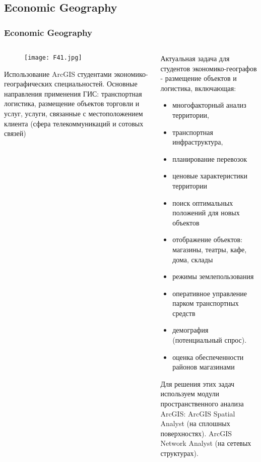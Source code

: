 \documentclass[pdflatex,compress,8pt,
	xcolor={dvipsnames,dvipsnames,svgnames,x11names,table},
	hyperref={	 
	pdfauthor={Lemenkova Polina}, 
	pdfsubject={Preentation}, 
	pdfcreator={Lemenkova Polina}, 
	pdfproducer={Lemenkova Polina}, 
	colorlinks=true,
	linkcolor=Red3, 
	citecolor=NavyBlue, 
	urlcolor = NavyBlue, 
	breaklinks = true}]{beamer}
\begin{document}
\subsection{Economic Geography}
\begin{frame}\frametitle{Economic Geography}

	\begin{minipage}[0.4\textheight]{\textwidth}
		\begin{columns}[T]
			\begin{column}{0.5\textwidth}
				\begin{figure}[H]
					\centering
					\texttt{[image: F41.jpg]}
				\end{figure}
\small{	
\begin{alertblock}{}
Использование ArcGIS студентами экономико-географических специальностей. Основные направления применения ГИС: транспортная логистика, размещение объектов торговли и услуг, услуги, связанные с местоположением клиента (сфера телекоммуникаций и сотовых связей)
\end{alertblock}
}
			\end{column}
			\begin{column}{0.5\textwidth}
\small{
\begin{block}{}
Актуальная задача для студентов экономико-географов - размещение объектов и логистика, 
включающая:
\begin{itemize}
	\item многофакторный анализ территории, 
	\item транспортная инфраструктура, 
	\item планирование перевозок
	\item ценовые характеристики территории
	\item поиск оптимальных положений для новых объектов 
	\item отображение объектов: магазины, театры, кафе, дома, склады
	\item режимы землепользования
	\item оперативное управление парком транспортных средств
	\item демография (потенциальный спрос).
	\item оценка обеспеченности районов магазинами 
\end{itemize}
Для решения этих задач используем модули пространственного анализа ArcGIS: ArcGIS Spatial Analyst (на сплошных поверхностях). ArcGIS Network Analyst (на сетевых структурах).
\end{block}
}
			\end{column}
		\end{columns}
	\end{minipage}

\end{frame}
\end{document}
